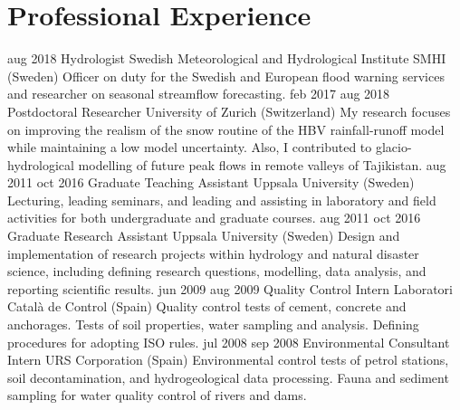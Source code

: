   \section{Professional Experience}
    \position
      {aug 2018 \textemdash{} }
      {Hydrologist}
      {Swedish Meteorological and Hydrological Institute SMHI (Sweden)}
      {Officer on duty for the Swedish and European flood warning services and researcher on seasonal streamflow forecasting.}
    \position
      {feb 2017 \textemdash{} aug 2018}
      {Postdoctoral Researcher}
      {University of Zurich (Switzerland)}
      {My research focuses on improving the realism of the snow routine of the HBV rainfall-runoff model while maintaining a low model uncertainty. Also, I contributed to glacio-hydrological modelling of future peak flows in remote valleys of Tajikistan.}
    \position
      {aug 2011 \textemdash{} oct 2016}
      {Graduate Teaching Assistant}
      {Uppsala University (Sweden)}
      {Lecturing, leading seminars, and leading and assisting in laboratory and field activities for both undergraduate and graduate courses.}
    \position
      {aug 2011 \textemdash{} oct 2016}
      {Graduate Research Assistant}
      {Uppsala University (Sweden)}
      {Design and implementation of research projects within hydrology and natural disaster science, including defining research questions, modelling, data analysis, and reporting scientific results.}
    \position
      {jun 2009 \textemdash{} aug 2009}
      {Quality Control Intern}
      {Laboratori Català de Control (Spain)}
      {Quality control tests of cement, concrete and anchorages. Tests of soil properties, water sampling and analysis. Defining procedures for adopting ISO rules.}
    \position
      {jul 2008 \textemdash{} sep 2008}
      {Environmental Consultant Intern}
      {URS Corporation (Spain)}
      {Environmental control tests of petrol stations, soil decontamination, and hydrogeological data processing. Fauna and sediment sampling for water quality control of rivers and dams.}
\fi
